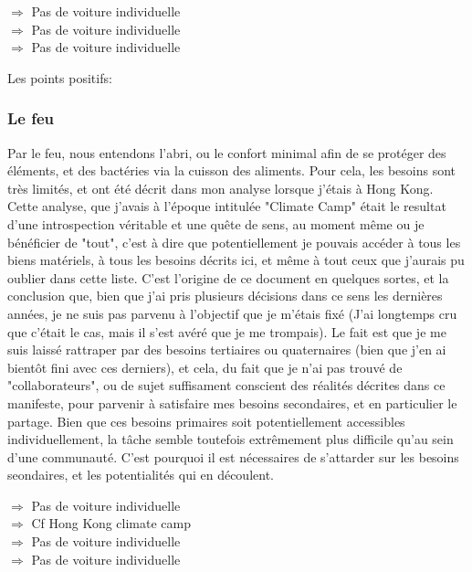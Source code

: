 \documentclass[11pt]{article} %
\begin{document}
\begin{flushleft}
$ \Rightarrow $ Pas de voiture individuelle\\
$ \Rightarrow $ Pas de voiture individuelle\\
$ \Rightarrow $ Pas de voiture individuelle\\
\end{flushleft}

Les points positifs:

\subsubsection{Le feu}
Par le feu, nous entendons l'abri, ou le confort minimal afin de se protéger des éléments, et des bactéries via la cuisson des aliments.
Pour cela, les besoins sont très limités, et ont été décrit dans mon analyse lorsque j'étais à Hong Kong. Cette analyse, que j'avais à l'époque intitulée "Climate Camp" était le resultat d'une introspection véritable et une quête de sens, au moment même ou je bénéficier de "tout", c'est à dire que potentiellement je pouvais accéder à tous les biens matériels, à tous les besoins décrits ici, et même à tout ceux que j'aurais pu oublier dans cette liste.
C'est l'origine de ce document en quelques sortes, et la conclusion que, bien que j'ai pris plusieurs décisions dans ce sens les dernières années, je ne suis pas parvenu à  l'objectif que je m'étais fixé (J'ai longtemps cru que c'était le cas, mais il s'est avéré que je me trompais).
Le fait est que je me suis laissé rattraper par des besoins tertiaires ou quaternaires (bien que j'en ai bientôt fini avec ces derniers), et cela, du fait que je n'ai pas trouvé de "collaborateurs", ou de sujet suffisament conscient des réalités décrites dans ce manifeste, pour parvenir à satisfaire mes besoins secondaires, et en particulier le partage.  
Bien que ces besoins primaires soit potentiellement accessibles individuellement, la tâche semble toutefois extrêmement plus difficile qu'au sein d'une communauté.
C'est pourquoi il est nécessaires de s'attarder sur les besoins seondaires, et les potentialités qui en découlent.\\
\begin{flushleft}
$ \Rightarrow $ Pas de voiture individuelle\\
$ \Rightarrow $ Cf Hong Kong climate camp\\
$ \Rightarrow $ Pas de voiture individuelle\\
$ \Rightarrow $ Pas de voiture individuelle\\
\end{flushleft}
\end{document}
